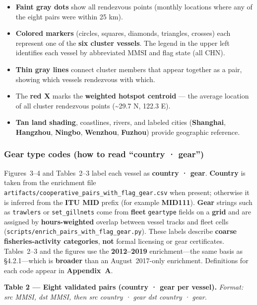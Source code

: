 \documentclass[
]{article}
\providecommand{\tightlist}{%
  \setlength{\itemsep}{0pt}\setlength{\parskip}{0pt}}
\begin{document}
\begin{itemize}
\tightlist
\item
  \textbf{Faint gray dots} show all rendezvous points (monthly locations
  where any of the eight pairs were within 25 km).
\item
  \textbf{Colored markers} (circles, squares, diamonds, triangles,
  crosses) each represent one of the \textbf{six cluster vessels}. The
  legend in the upper left identifies each vessel by abbreviated MMSI
  and flag state (all CHN).
\item
  \textbf{Thin gray lines} connect cluster members that appear together
  as a pair, showing which vessels rendezvous with which.
\item
  The \textbf{red X} marks the \textbf{weighted hotspot centroid} ---
  the average location of all cluster rendezvous points
  (\textasciitilde29.7 N, 122.3 E).
\item
  \textbf{Tan land shading}, coastlines, rivers, and labeled cities
  (\textbf{Shanghai}, \textbf{Hangzhou}, \textbf{Ningbo},
  \textbf{Wenzhou}, \textbf{Fuzhou}) provide geographic reference.
\end{itemize}

\subsubsection{Gear type codes (how to read ``country ·
gear'')}\label{gear-type-codes-how-to-read-country-gear}

Figures~3--4 and Tables~2--3 label each vessel as \textbf{country ·
gear}. \textbf{Country} is taken from the enrichment file
\texttt{artifacts/cooperative\_pairs\_with\_flag\_gear.csv} when
present; otherwise it is inferred from the \textbf{ITU MID} prefix (for
example \textbf{MID111}). \textbf{Gear} strings such as
\texttt{trawlers} or \texttt{set\_gillnets} come from \textbf{fleet}
\texttt{geartype} fields on a \textbf{grid} and are assigned by
\textbf{hours-weighted} overlap between vessel tracks and fleet cells
(\texttt{scripts/enrich\_pairs\_with\_flag\_gear.py}). These labels
describe \textbf{coarse fisheries-activity categories}, \textbf{not}
formal licensing or gear certificates. Tables~2--3 and the figures use
the \textbf{2012--2019} enrichment---the same basis as §4.2.1---which is
\textbf{broader} than an August~2017-only enrichment. Definitions for
each code appear in \textbf{Appendix~A}.

\textbf{Table 2 --- Eight validated pairs (country · gear per vessel).}
\emph{Format: src MMSI, dst MMSI, then src country · gear \textbar{} dst
country · gear.}
\end{document}
